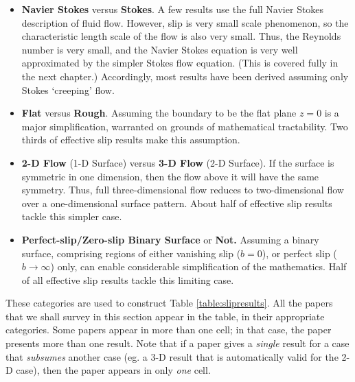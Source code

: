 \documentclass[a4paper]{report}
\begin{document}
\begin{itemize}

\item \textbf{Navier Stokes} versus \textbf{Stokes}.  A few results use the full Navier Stokes description of fluid flow.  However, slip is very small scale phenomenon, so the characteristic length scale of the flow is also very small.  Thus, the Reynolds number is very small, and the Navier Stokes equation is very well approximated by the simpler Stokes flow equation.  (This is covered fully in the next chapter.)  Accordingly, most results have been derived assuming only Stokes `creeping' flow.

\item \textbf{Flat} versus \textbf{Rough}. Assuming the boundary to be the flat plane $z=0$ is a major simplification, warranted on grounds of mathematical tractability.  Two thirds of effective slip results make this assumption.

\item \textbf{2-D Flow} (1-D Surface) versus \textbf{3-D Flow} (2-D Surface).
If the surface is symmetric in one dimension, then the flow above it will have the same symmetry.  Thus, full three-dimensional flow reduces to two-dimensional flow over a one-dimensional surface pattern.  About half of effective slip results tackle this simpler case.

\item \textbf{Perfect-slip/Zero-slip Binary Surface} or \textbf{Not.}  Assuming a binary surface, comprising regions of either vanishing slip ($b=0$), or perfect slip ($b \rightarrow \infty$) only, can enable considerable simplification of the mathematics.  Half of all effective slip results tackle this limiting case.

\end{itemize}

These categories are used to construct Table \ref{table:slipresults}.  All the papers that we shall survey in this section appear in the table, in their appropriate categories.  Some papers appear in more than one cell; in that case, the paper presents more than one result.  Note that if a paper gives a \emph{single} result for a case that \emph{subsumes} another case (eg. a 3-D result that is automatically valid for the 2-D case), then the paper appears in only \emph{one} cell.
\end{document}
